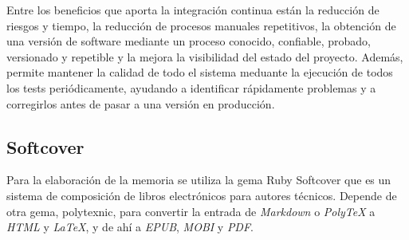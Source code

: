 Entre los beneficios que aporta la integración continua están la reducción de riesgos y tiempo, la reducción de procesos manuales repetitivos, la obtención de una versión de software mediante un proceso conocido, confiable, probado, versionado y repetible y la mejora la visibilidad del estado del proyecto. Además, permite mantener la calidad de todo el sistema meduante la ejecución de todos los tests periódicamente, ayudando a identificar rápidamente problemas y a corregirlos antes de pasar a una versión en producción.

\subsection{Softcover}

Para la elaboración de la memoria se utiliza la gema Ruby Softcover que es un sistema de composición de libros electrónicos para autores técnicos. Depende de otra gema, polytexnic, para convertir la entrada de \textit{Markdown} o \textit{PolyTeX} a \textit{HTML} y \textit{LaTeX}, y de ahí a \textit{EPUB}, \textit{MOBI} y \textit{PDF}.

